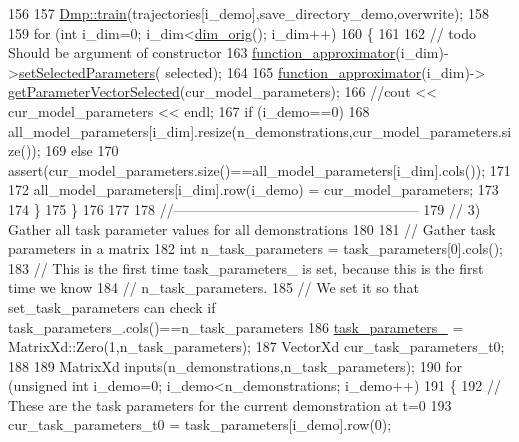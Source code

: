 \begin{DoxyCode}
156     
157     \hyperlink{classDmpBbo_1_1Dmp_a5d14dedc6736ec5675b4026437b8a597}{Dmp::train}(trajectories[i\_demo],save\_directory\_demo,overwrite);
158     
159     \textcolor{keywordflow}{for} (\textcolor{keywordtype}{int} i\_dim=0; i\_dim<\hyperlink{group__DynamicalSystems_ga93d7cbbf2e471b00f124e41706405a05}{dim\_orig}(); i\_dim++)
160     \{
161 
162       \textcolor{comment}{// todo Should be argument of constructor}
163       \hyperlink{classDmpBbo_1_1Dmp_ac428e2dd848c99ddaf517f2dbacdf3ad}{function\_approximator}(i\_dim)->\hyperlink{classDmpBbo_1_1FunctionApproximator_a8a976b5db2d1809ece10e431816f0f27}{setSelectedParameters}(
      selected); 
164   
165       \hyperlink{classDmpBbo_1_1Dmp_ac428e2dd848c99ddaf517f2dbacdf3ad}{function\_approximator}(i\_dim)->
      \hyperlink{classDmpBbo_1_1FunctionApproximator_aab955bec57f074a991b8be31d6ce54ca}{getParameterVectorSelected}(cur\_model\_parameters);
166       \textcolor{comment}{//cout << cur\_model\_parameters << endl;}
167       \textcolor{keywordflow}{if} (i\_demo==0)
168         all\_model\_parameters[i\_dim].resize(n\_demonstrations,cur\_model\_parameters.size());
169       \textcolor{keywordflow}{else}
170         assert(cur\_model\_parameters.size()==all\_model\_parameters[i\_dim].cols());
171 
172       all\_model\_parameters[i\_dim].row(i\_demo) = cur\_model\_parameters;
173       
174     \}
175   \}
176 
177    
178   \textcolor{comment}{//-----------------------------------------------------}
179   \textcolor{comment}{// 3) Gather all task parameter values for all demonstrations}
180   
181   \textcolor{comment}{// Gather task parameters in a matrix}
182   \textcolor{keywordtype}{int} n\_task\_parameters = task\_parameters[0].cols();
183   \textcolor{comment}{// This is the first time task\_parameters\_ is set, because this is the first time we know }
184   \textcolor{comment}{// n\_task\_parameters.}
185   \textcolor{comment}{// We set it so that set\_task\_parameters can check if task\_parameters\_.cols()==n\_task\_parameters}
186   \hyperlink{classDmpBbo_1_1DmpContextual_af0d2e6fef248e131b92fc244b55b50c6}{task\_parameters\_} = MatrixXd::Zero(1,n\_task\_parameters);
187   VectorXd cur\_task\_parameters\_t0;
188   
189   MatrixXd inputs(n\_demonstrations,n\_task\_parameters);
190   \textcolor{keywordflow}{for} (\textcolor{keywordtype}{unsigned} \textcolor{keywordtype}{int} i\_demo=0; i\_demo<n\_demonstrations; i\_demo++)
191   \{
192     \textcolor{comment}{// These are the task parameters for the current demonstration at t=0}
193     cur\_task\_parameters\_t0 = task\_parameters[i\_demo].row(0);

\end{DoxyCode}
